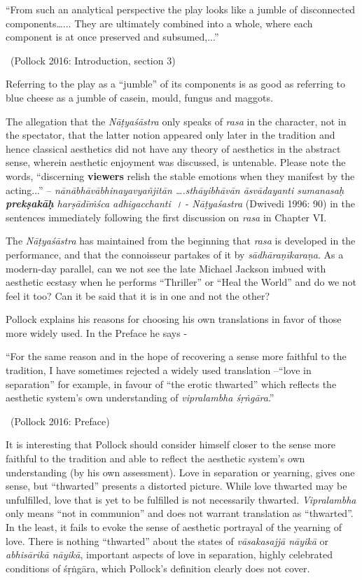 \begin{myquote}
“From such an analytical perspective the play looks like a jumble of disconnected components…... They are ultimately combined into a whole, where each component is at once preserved and subsumed,...” 

~\hfill (Pollock 2016: Introduction, section 3)
\end{myquote}

Referring to the play as a “jumble” of its components is as good as referring to blue cheese as a jumble of casein, mould, fungus and maggots.

The allegation that the \textit{Nāṭyaśāstra} only speaks of \textit{rasa} in the character, not in the spectator, that the latter notion appeared only later in the tradition and hence classical aesthetics did not have any theory of aesthetics in the abstract sense, wherein aesthetic enjoyment was discussed, is untenable. Please note the words, “discerning \textbf{viewers} relish the stable emotions when they manifest by the acting...” -- \textit{nānābhāvābhinayavyañjitān ….sthāyibhāvān āsvādayanti sumanasaḥ \textbf{prekṣakāḥ} harṣādīṁśca adhigacchanti~।} - \textit{Nāṭyaśastra} (Dwivedi 1996: 90) in the sentences immediately following the first discussion on \textit{rasa }in Chapter VI.

The \textit{Nāṭyaśāstra} has maintained from the beginning that \textit{rasa} is developed in the performance, and that the connoisseur partakes of it by \textit{sādhāraṇīkaraṇa}. As a modern-day parallel, can we not see the late Michael Jackson imbued with aesthetic ecstasy when he performs “Thriller” or “Heal the World” and do we not feel it too? Can it be said that it is in one and not the other?

Pollock explains his reasons for choosing his own translations in favor of those more widely used. In the Preface he says -

\begin{myquote}
“For the same reason and in the hope of recovering a sense more faithful to the tradition, I have sometimes rejected a widely used translation –“love in separation” for example, in favour of “the erotic thwarted” which reflects the aesthetic system’s own understanding of \textit{vipralambha śṛṅgāra}.” 

~\hfill (Pollock 2016: Preface)
\end{myquote}

It is interesting that Pollock should consider himself closer to the sense more faithful to the tradition and able to reflect the aesthetic system’s own understanding (by his own assessment). Love in separation or yearning, gives one sense, but “thwarted” presents a distorted picture. While love thwarted may be unfulfilled, love that is yet to be fulfilled is not necessarily thwarted. \textit{Vipralambha} only means “not in communion” and does not warrant translation as “thwarted”. In the least, it fails to evoke the sense of aesthetic portrayal of the yearning of love. There is nothing “thwarted” about the states of \textit{vāsakasajjā nāyikā} or \textit{abhisārikā nāyikā}, important aspects of love in separation, highly celebrated conditions of śṛṅgāra, which Pollock’s definition clearly does not cover.


